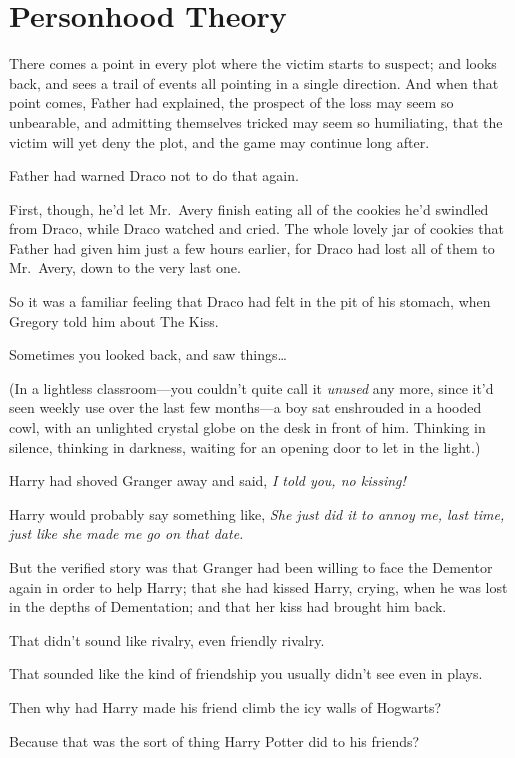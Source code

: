 \chapter{Personhood Theory}\label{personhood-theory}

There comes a point in every plot where the victim starts to suspect;
and looks back, and sees a trail of events all pointing in a single
direction. And when that point comes, Father had explained, the prospect
of the loss may seem so unbearable, and admitting themselves tricked may
seem so humiliating, that the victim will yet deny the plot, and the
game may continue long after.

Father had warned Draco not to do that again.

First, though, he'd let Mr.~Avery finish eating all of the cookies he'd
swindled from Draco, while Draco watched and cried. The whole lovely jar
of cookies that Father had given him just a few hours earlier, for Draco
had lost all of them to Mr.~Avery, down to the very last one.

So it was a familiar feeling that Draco had felt in the pit of his
stomach, when Gregory told him about The Kiss.

Sometimes you looked back, and saw things\ldots{}

(In a lightless classroom---you couldn't quite call it \emph{unused} any
more, since it'd seen weekly use over the last few months---a boy sat
enshrouded in a hooded cowl, with an unlighted crystal globe on the desk
in front of him. Thinking in silence, thinking in darkness, waiting for
an opening door to let in the light.)

Harry had shoved Granger away and said, \emph{I told you, no kissing!}

Harry would probably say something like, \emph{She just did it to annoy
me, last time, just like she made me go on that date.}

But the verified story was that Granger had been willing to face the
Dementor again in order to help Harry; that she had kissed Harry,
crying, when he was lost in the depths of Dementation; and that her kiss
had brought him back.

That didn't sound like rivalry, even friendly rivalry.

That sounded like the kind of friendship you usually didn't see even in
plays.

Then why had Harry made his friend climb the icy walls of Hogwarts?

Because that was the sort of thing Harry Potter did to his friends?

